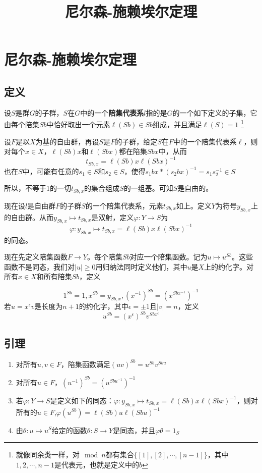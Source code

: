 \documentclass[UTF8]{article}
\title{尼尔森-施赖埃尔定理}
\begin{document}
	\maketitle
	\tableofcontents
	\newpage
	\section{尼尔森-施赖埃尔定理}
	
	\subsection{定义}
	设$S$是群$G$的子群，$S$在$G$中的一个\textbf{陪集代表系}$l$指的是$G$的一个如下定义的子集，它由每个陪集$Sb$中恰好取出一个元素$\ell(Sb) \in Sb$组成，并且满足$\ell(S) = 1$ \footnote{就像同余类一样，对$\mod n$都有集合$\{[1],[2],\cdots,[n-1]\}$，其中$1,2,\cdots,n-1$是代表元，也就是定义中的$b$}
	
	设$F$是以$X$为基的自由群，再设$S$是$F$的子群，给定$S$在$F$中的一个陪集代表系$\ell$，则对每个$x\in X$，$\ell(Sb)x$和$\ell(Sbx)$都在陪集$Sbx$中，从而
	$$
	t_{Sb,x} = \ell(Sb)x\ell(Sbx)^{-1}
	$$
	也在$S$中，可能有任意的$s_1\in S$和$s_2\in S$，使得$s_1bx * (s_2bx)^{-1} = s_1s^{-1}_2\in S$
	
	所以，不等于1的一切$t_{Sb,x}$的集合组成$S$的一组基。可知$S$是自由的。
	
	现在设$l$是自由群$F$的子群$S$的一个陪集代表系，元素$t_{Sb,x}$如上。定义$Y$为符号$y_{Sb,x}$上的自由群。从而$y_{Sb,x} \mapsto t_{Sb,x}$是双射，定义$\varphi :Y \to S$为
	$$
	\varphi :y_{Sb,x} \mapsto t_{Sb,x} = \ell(Sb)x\ell(Sbx)^{-1}
	$$
	的同态。 
	
	现在先定义陪集函数$F\to Y$。每个陪集$Sb$对应一个陪集函数。记为$u\mapsto u^{Sb}$。这些函数不是同态，我们对$\mid u\mid \geq 0$用归纳法同时定义他们，其中$u$是$X$上的约化字。对所有$x\in X$和所有陪集$Sb$，定义
	
	$$
	1^{Sb} = 1, x^{Sb} = y_{Sb,x}, (x^{-1})^{Sb} = (x^{Sbx^{-1}})^{-1}
	$$
	若$u = x^\epsilon v$是长度为$n+1$的约化字，其中$\epsilon = \pm 1$且$\mid v\mid =n$，定义
	$$
	u^{Sb} = (x^\epsilon)^{Sb}v^{Sbx^
	\epsilon}
	$$
	
	\newpage
	\subsection{引理}
	
	\begin{enumerate}
		\item 对所有$u,v\in F$，陪集函数满足$(uv)^{Sb} = u^{Sb}v^{Sbu}$
		\item 对所有$u\in F$，$(u^{-1})^{Sb} = (u^{Sbu^{-1}})^{-1}$
		\item 若$\varphi :Y\to S$是定义如下的同态：$\varphi:y_{Sb,x}\mapsto t_{Sb,x} = \ell(Sb)x\ell(Sbx)^{-1}$，则对所有的$u\in F$,$\varphi(u^{Sb}) = \ell(Sb)u\ell(Sbu)^{-1}$
		\item 由$\theta:u \mapsto u^S$给定的函数$\theta:S\to Y$是同态，并且$\varphi\theta = 1_S$
	\end{enumerate}
	
\end{document}
